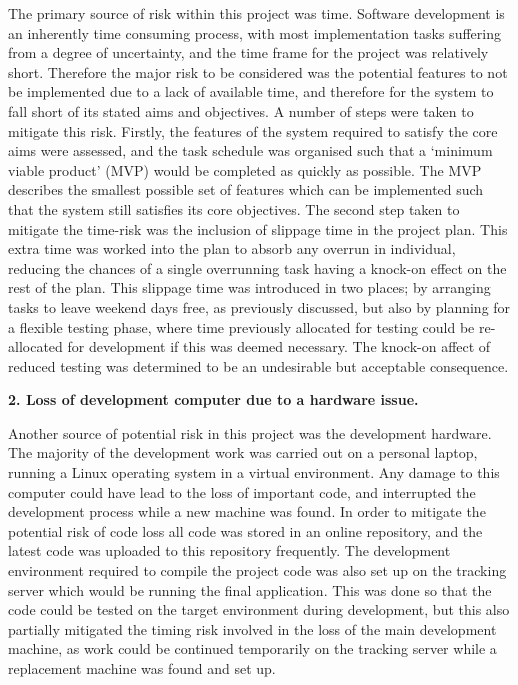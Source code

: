 The primary source of risk within this project was time. Software development is an inherently time consuming process, with most implementation tasks suffering from a degree of uncertainty, and the time frame for the project was relatively short. Therefore the major risk to be considered was the potential features to not be implemented due to a lack of available time, and therefore for the system to fall short of its stated aims and objectives. A number of steps were taken to mitigate this risk. Firstly, the features of the system required to satisfy the core aims were assessed, and the task schedule was organised such that a `minimum viable product' (MVP) would be completed as quickly as possible. The MVP describes the smallest possible set of features which can be implemented such that the system still satisfies its core objectives. The second step taken to mitigate the time-risk was the inclusion of slippage time in the project plan. This extra time was worked into the plan to absorb any overrun in individual, reducing the chances of a single overrunning task having a knock-on effect on the rest of the plan. This slippage time was introduced in two places; by arranging tasks to leave weekend days free, as previously discussed, but also by planning for a flexible testing phase, where time previously allocated for testing could be re-allocated for development if this was deemed necessary. The knock-on affect of reduced testing was determined to be an undesirable but acceptable consequence.

\textbf{2. Loss of development computer due to a hardware issue.}

Another source of potential risk in this project was the development hardware. The majority of the development work was carried out on a personal laptop, running a Linux operating system in a virtual environment. Any damage to this computer could have lead to the loss of important code, and interrupted the development process while a new machine was found. In order to mitigate the potential risk of code loss all code was stored in an online repository, and the latest code was uploaded to this repository frequently. The development environment required to compile the project code was also set up on the tracking server which would be running the final application. This was done so that the code could be tested on the target environment during development, but this also partially mitigated the timing risk involved in the loss of the main development machine, as work could be continued temporarily on the tracking server while a replacement machine was found and set up.

